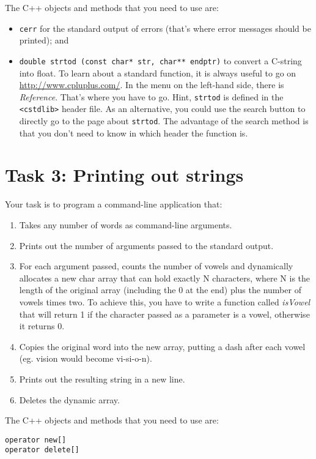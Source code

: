 The C++ objects and methods that you need to use are:
\begin{itemize}
\item \verb+cerr+ for the standard output of errors (that's where error messages should be printed); and 
\item \verb+double strtod (const char* str, char** endptr)+ to convert a C-string into float. To learn about a standard function, it is always useful to go on \url{http://www.cpluplus.com/}. In the menu on the left-hand side, there is \emph{Reference}. That's where you have to go. Hint, \verb+strtod+ is defined in the \verb+<cstdlib>+ header file. As an alternative, you could use the search button to directly go to the page about \verb+strtod+. The advantage of the search method is that you don't need to know in which header the function is.
\end{itemize}

\section*{Task 3: Printing out strings}

Your task is to program a command-line application that:
\begin{enumerate}
	\item Takes any number of words as command-line arguments.
	\item Prints out the number of arguments passed to the standard output.
	\item For each argument passed, counts the number of vowels and dynamically allocates a new char array that can hold
		  exactly N characters, where N is the length of the original array (including the 0 at the end) plus the number of vowels times two.
		  To achieve this, you have to write a function called \emph{isVowel} that will return 1 if the character passed as a parameter
		  is a vowel, otherwise it returns 0.
	\item Copies the original word into the new array, putting a dash after each vowel (eg. vision would become vi-si-o-n).
	\item Prints out the resulting string in a new line.
	\item Deletes the dynamic array.
\end{enumerate}

The C++ objects and methods that you need to use are:
\begin{verbatim}
operator new[]
operator delete[]
\end{verbatim}


